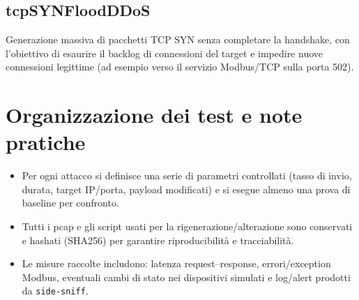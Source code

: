\subsection{tcpSYNFloodDDoS}
Generazione massiva di pacchetti TCP SYN senza completare la handshake, con l'obiettivo di esaurire il backlog di connessioni del target e impedire nuove connessioni legittime (ad esempio verso il servizio Modbus/TCP sulla porta 502).

\section{Organizzazione dei test e note pratiche}
\begin{itemize}
  \item Per ogni attacco si definisce una serie di parametri controllati (tasso di invio, durata, target IP/porta, payload modificati) e si esegue almeno una prova di baseline per confronto.
  \item Tutti i pcap e gli script usati per la rigenerazione/alterazione sono conservati e hashati (SHA256) per garantire riproducibilità e tracciabilità.
  \item Le misure raccolte includono: latenza request--response, errori/exception Modbus, eventuali cambi di stato nei dispositivi simulati e log/alert prodotti da \texttt{side-sniff}.
\end{itemize}

\nocite{scadaAttacks,DatasetModbus}
